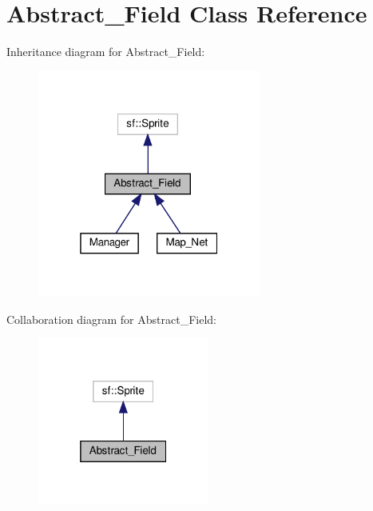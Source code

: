 \section{Abstract\+\_\+\+Field Class Reference}
\label{class_abstract___field}


Inheritance diagram for Abstract\+\_\+\+Field\+:
\nopagebreak
\begin{figure}[H]
\begin{center}
\leavevmode
\includegraphics[width=208pt]{class_abstract___field__inherit__graph}
\end{center}
\end{figure}


Collaboration diagram for Abstract\+\_\+\+Field\+:
\nopagebreak
\begin{figure}[H]
\begin{center}
\leavevmode
\includegraphics[width=160pt]{class_abstract___field__coll__graph}
\end{center}
\end{figure}
